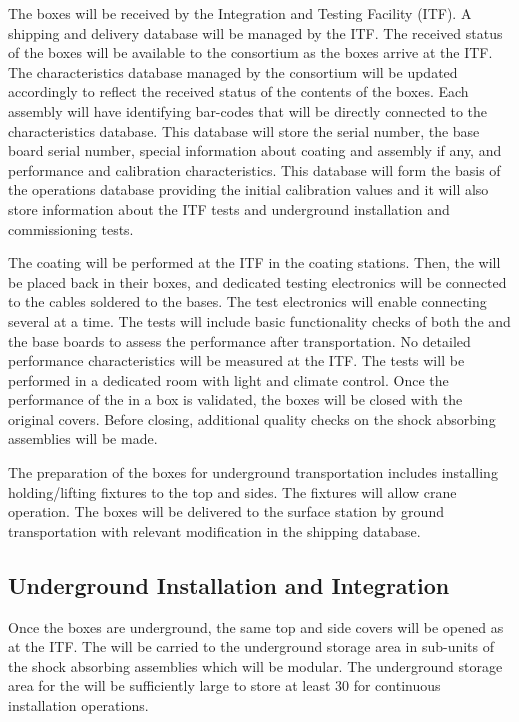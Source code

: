 The  boxes will be received by the Integration and Testing Facility (ITF). A shipping and delivery database will be managed by the ITF. The received status of the boxes will be available to the \dual {} consortium as the boxes arrive at the ITF. The  characteristics database managed by the \dual {} consortium will be updated accordingly to reflect the received status of the contents of the boxes. Each  assembly will have identifying bar-codes that will be directly connected to the  characteristics database. This database will store the  serial number, the base board serial number, special information about  coating and assembly if any, and performance and calibration characteristics. This database will form the basis of the operations database providing the initial calibration values and it will also store information about the ITF tests and underground installation and commissioning tests.

The  coating will be performed at the ITF in the coating stations. Then, the  will be placed back in their boxes, and dedicated testing electronics will be connected to the  cables soldered to the  bases. The test electronics will enable connecting several  at a time. The tests will include basic functionality checks of both the  and the base boards to assess the performance after transportation. No detailed performance characteristics will be measured at the ITF. The tests will be performed in a dedicated room with light and climate control. Once the performance of the  in a box is validated, the boxes will be closed with the original covers. Before closing, additional quality checks on the shock absorbing assemblies will be made.

The preparation of the  boxes for underground transportation includes installing holding/lifting fixtures to the top and sides. The fixtures will allow crane operation. The boxes will be delivered to the surface station by ground transportation with relevant modification in the shipping database.

\subsection{Underground Installation and Integration}
\label{sec:fddp-pd-9.3}

Once the  boxes are underground, the same top and side covers will be opened as at the ITF. The  will be carried to the underground storage area in sub-units of the shock absorbing assemblies which will be modular. The underground storage area for the  will be sufficiently large to store at least \num{30}  for continuous installation operations.

